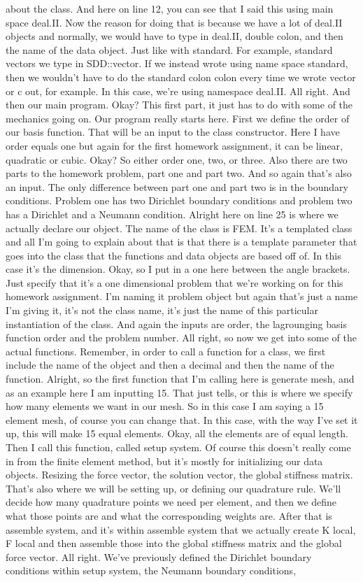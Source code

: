\documentclass[10pt]{article}
\begin{document}
about the class. And here on line 12, you can see that I said this using main space deal.II. Now the reason for doing that is because we have a lot of deal.II objects and normally, we would have to type in deal.II, double colon, and then the name of the data object. Just like with standard. For example, standard vectors we type in SDD::vector. If we instead wrote using name space standard, then we wouldn't have to do the standard colon colon every time we wrote vector or c out, for example. In this case, we're using namespace deal.II. All right. And then our main program. Okay? This first part, it just has to do with some of the mechanics going on. Our program really starts here. First we define the order of our basis function. That will be an input to the class constructor. Here I have order equals one but again for the first homework assignment, it can be linear, quadratic or cubic. Okay? So either order one, two, or three. Also there are two parts to the homework problem, part one and part two. And so again that's also an input. The only difference between part one and part two is in the boundary conditions. Problem one has two Dirichlet boundary conditions and problem two has a Dirichlet and a Neumann condition. Alright here on line 25 is where we actually declare our object. The name of the class is FEM. It's a templated class and all I'm going to explain about that is that there is a template parameter that goes into the class that the functions and data objects are based off of. In this case it's the dimension. Okay, so I put in a one here between the angle brackets. Just specify that it's a one dimensional problem that we're working on for this homework assignment. I'm naming it problem object but again that's just a name I'm giving it, it's not the class name, it's just the name of this particular instantiation of the class. And again the inputs are order, the lagrounging basis function order and the problem number. All right, so now we get into some of the actual functions. Remember, in order to call a function for a class, we first include the name of the object and then a decimal and then the name of the function. Alright, so the first function that I'm calling here is generate mesh, and as an example here I am inputting 15. That just tells, or this is where we specify how many elements we want in our mesh. So in this case I am saying a 15 element mesh, of course you can change that. In this case, with the way I've set it up, this will make 15 equal elements. Okay, all the elements are of equal length. Then I call this function, called setup system. Of course this doesn't really come in from the finite element method, but it's mostly for initializing our data objects. Resizing the force vector, the solution vector, the global stiffness matrix. That's also where we will be setting up, or defining our quadrature rule. We'll decide how many quadrature points we need per element, and then we define what those points are and what the corresponding weights are. After that is assemble system, and it's within assemble system that we actually create K local, F local and then assemble those into the global stiffness matrix and the global force vector. All right. We've previously defined the Dirichlet boundary conditions within setup system, the Neumann boundary conditions, 
\end{document}
